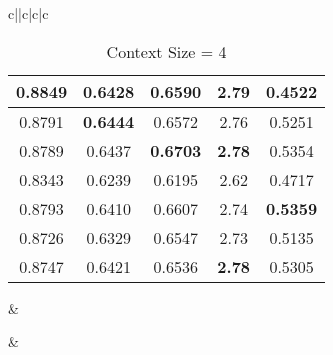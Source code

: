 \documentclass{article}
\begin{document}
\begin{table*}[htbp!]
\begin{tabular}{c||c|c|c}
\begin{subtable}[h]{0.26\textwidth}
{\begin{tabular}{ccccc}
     \textbf{0.8849} & 0.6428 & 0.6590 & 2.79 & 0.4522\\ \hline 0.8791 & \textbf{0.6444} & 0.6572 & 2.76 & 0.5251\\ \hline 0.8789 & 0.6437 & \textbf{0.6703} & \textbf{2.78} & 0.5354\\ \hline \hline 0.8343 & 0.6239 & 0.6195 & 2.62 & 0.4717\\ \hline 0.8793 & 0.6410 & 0.6607 & 2.74 & \textbf{0.5359}\\ \hline 0.8726 & 0.6329 & 0.6547 & 2.73 & 0.5135\\ \hline 0.8747 & 0.6421 & 0.6536 & \textbf{2.78} & 0.5305\\ \hline \end{tabular}}
    \caption{Context Size = 2}
    \label{tab:recurrent_res2}
\end{subtable} &
\begin{subtable}[h]{0.26\textwidth}
    \caption{Context Size = 4}
    \label{tab:recurrent_res4}
\end{subtable} &

\begin{subtable}[h]{0.26\textwidth}
\end{subtable}
\end{tabular}
\end{table*}
\end{document}
